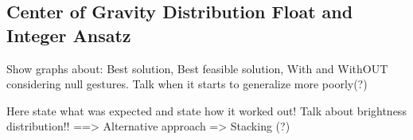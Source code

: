 \subsection{Center of Gravity Distribution Float and Integer Ansatz}
Show graphs about:
Best solution,
Best feasible solution,
With and WithOUT considering null gestures.
Talk when it starts to generalize more poorly(?)

Here state what was expected and state how it worked out!
Talk about brightness distribution!!
 ==> Alternative approach => Stacking (?)